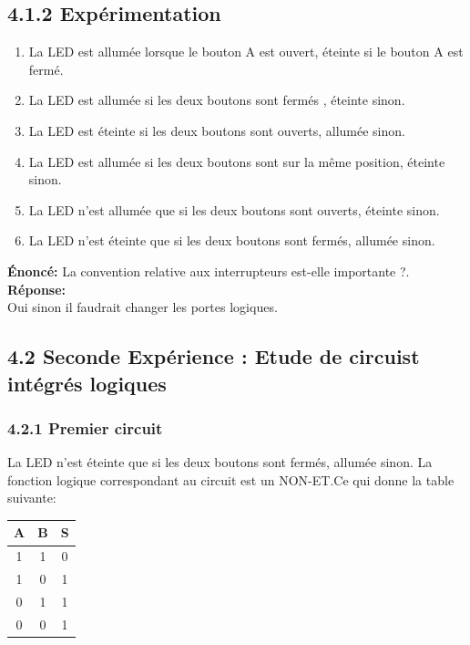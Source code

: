 \documentclass{report}
\begin{document}
\subsection*{4.1.2 Exp\'erimentation}
\begin{enumerate}
\item La LED est allum\'ee lorsque le bouton A est ouvert, \'eteinte si le bouton A est ferm\'e.
\item La LED est allum\'ee si les deux boutons sont ferm\'es , \'eteinte sinon.
\item La LED est \'eteinte si les deux boutons sont ouverts, allum\'ee sinon.
\item La LED est allum\'ee si les deux boutons sont sur la m\^eme position, \'eteinte sinon.
\item La LED n'est allum\'ee que si les deux boutons sont ouverts, \'eteinte sinon.
\item La LED n'est \'eteinte que si les deux boutons sont ferm\'es, allum\'ee sinon.

\end{enumerate}

\textbf{\'Enonc\'e:} La convention relative aux interrupteurs est-elle importante ?. \\


\textbf{R\'eponse:}  \\
Oui sinon il faudrait changer les portes logiques.

\newpage
\subsection*{4.2 Seconde Expérience : Etude de circuist int\'egr\'es logiques}
\subsubsection*{4.2.1 Premier circuit}
\hspace*{1,5cm} La LED n'est \'eteinte que si les deux boutons sont ferm\'es, allum\'ee sinon. La fonction logique correspondant au circuit est un NON-ET.Ce qui donne la table suivante:\\
\begin{tabular}{|c|c|c|}
\hline
A & B & S \\
\hline
1&1&0\\
1&0&1\\
0&1&1\\
0&0&1\\
\hline
\end{tabular}\\
\end{document}
